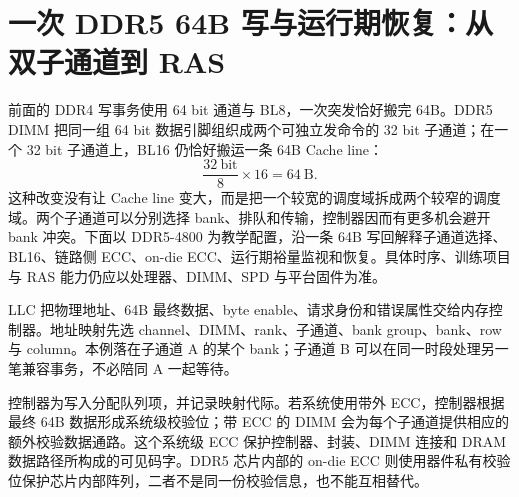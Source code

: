 \section{一次 DDR5 64B 写与运行期恢复：从双子通道到 RAS}

前面的 DDR4 写事务使用 64 bit 通道与 BL8，一次突发恰好搬完 64B。DDR5 DIMM 把同一组 64 bit 数据引脚组织成两个可独立发命令的 32 bit 子通道；在一个 32 bit 子通道上，BL16 仍恰好搬运一条 64B Cache line：
\[
  \frac{32\ \mathrm{bit}}{8}\times 16=64\ \mathrm{B}.
\]
这种改变没有让 Cache line 变大，而是把一个较宽的调度域拆成两个较窄的调度域。两个子通道可以分别选择 bank、排队和传输，控制器因而有更多机会避开 bank 冲突。下面以 DDR5-4800 为教学配置，沿一条 64B 写回解释子通道选择、BL16、链路侧 ECC、on-die ECC、运行期裕量监视和恢复。具体时序、训练项目与 RAS 能力仍应以处理器、DIMM、SPD 与平台固件为准。\cite{micron-ddr5}


LLC 把物理地址、64B 最终数据、byte enable、请求身份和错误属性交给内存控制器。地址映射先选 channel、DIMM、rank、子通道、bank group、bank、row 与 column。本例落在子通道 A 的某个 bank；子通道 B 可以在同一时段处理另一笔兼容事务，不必陪同 A 一起等待。

控制器为写入分配队列项，并记录映射代际。若系统使用带外 ECC，控制器根据最终 64B 数据形成系统级校验位；带 ECC 的 DIMM 会为每个子通道提供相应的额外校验数据通路。这个系统级 ECC 保护控制器、封装、DIMM 连接和 DRAM 数据路径所构成的可见码字。DDR5 芯片内部的 on-die ECC 则使用器件私有校验位保护芯片内部阵列，二者不是同一份校验信息，也不能互相替代。

